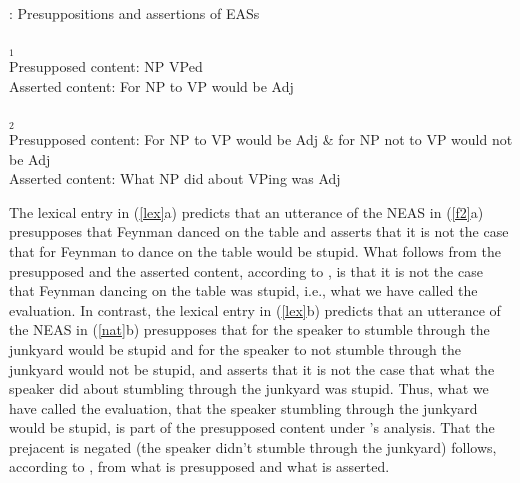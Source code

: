 \documentclass[11pt,fleqn]{article}
\newcommand{\6}{\mbox{$[\hspace*{-.6mm}[$}}
\newcommand{\9}{\mbox{$]\hspace*{-.6mm}]$}}
\newcommand{\citepos}[1]{\citeauthor{#1}'s \citeyear{#1}}
\begin{document}
\begin{exe}
\ex\label{lex} \citealt[249]{karttunen-etal2014}: Presuppositions and assertions of EASs 
\begin{xlist}
$_1$
\\ Presupposed content: NP VPed
\\ Asserted content: For NP to VP would be Adj

$_2$
\\ Presupposed content: For NP to VP would be Adj \& for NP not to VP would not be Adj
\\ Asserted content: What NP did about VPing was Adj

\end{xlist}
\end{exe}
The lexical entry in (\ref{lex}a) predicts that an utterance of the NEAS in (\ref{f2}a) presupposes that Feynman danced on the table and asserts that it is not the case that for Feynman to dance on the table would be stupid. What follows from the presupposed and the asserted content, according to \citealt[248]{karttunen-etal2014}, is that it is not the case that Feynman dancing on the table was stupid, i.e., what we have called the evaluation. In contrast, the lexical entry in (\ref{lex}b) predicts that an utterance of the NEAS in (\ref{nat}b) presupposes that for the speaker to stumble through the junkyard would be stupid and for the speaker to not stumble through the junkyard would not be stupid, and asserts that it is not the case that what the speaker did about stumbling through the junkyard was stupid. Thus, what we have called the evaluation, that the speaker stumbling through the junkyard would be stupid, is part of the presupposed content under \citepos{karttunen-etal2014} analysis. That the prejacent is negated (the speaker didn't stumble through the junkyard) follows, according to \citealt[249]{karttunen-etal2014}, from what is presupposed and what is asserted.
\end{document}
